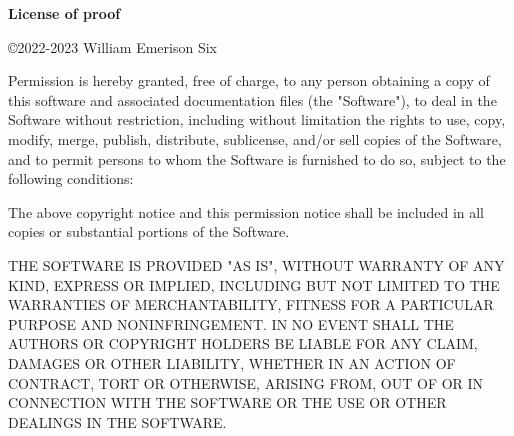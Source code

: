 \documentclass[12pt]{article}
\begin{document}
\textbf{License of proof }

\copyright 2022-2023 William Emerison Six

Permission is hereby granted, free of charge, to any person obtaining a copy of this software and associated documentation files (the "Software"), to deal in the Software without restriction, including without limitation the rights to use, copy, modify, merge, publish, distribute, sublicense, and/or sell copies of the Software, and to permit persons to whom the Software is furnished to do so, subject to the following conditions:

The above copyright notice and this permission notice shall be included in all copies or substantial portions of the Software.

THE SOFTWARE IS PROVIDED "AS IS", WITHOUT WARRANTY OF ANY KIND, EXPRESS OR IMPLIED, INCLUDING BUT NOT LIMITED TO THE WARRANTIES OF MERCHANTABILITY, FITNESS FOR A PARTICULAR PURPOSE AND NONINFRINGEMENT. IN NO EVENT SHALL THE AUTHORS OR COPYRIGHT HOLDERS BE LIABLE FOR ANY CLAIM, DAMAGES OR OTHER LIABILITY, WHETHER IN AN ACTION OF CONTRACT, TORT OR OTHERWISE, ARISING FROM, OUT OF OR IN CONNECTION WITH THE SOFTWARE OR THE USE OR OTHER DEALINGS IN THE SOFTWARE.
\end{document}
